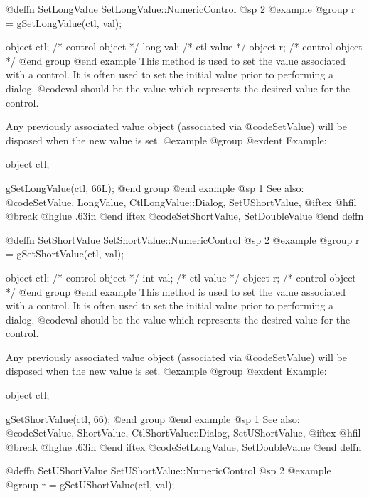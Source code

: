 @deffn {SetLongValue} SetLongValue::NumericControl
@sp 2
@example
@group
r = gSetLongValue(ctl, val);

object  ctl;    /*  control object  */
long    val;    /*  ctl value       */
object  r;      /*  control object  */
@end group
@end example
This method is used to set the value associated with a control.  It is
often used to set the initial value prior to performing a dialog.
@code{val} should be the value which represents the desired value for
the control.

Any previously associated value object (associated via @code{SetValue})
will be disposed when the new value is set.
@example
@group
@exdent Example:

object  ctl;

gSetLongValue(ctl, 66L);
@end group
@end example
@sp 1
See also:  @code{SetValue, LongValue, CtlLongValue::Dialog, SetUShortValue,}
@iftex
@hfil @break @hglue .63in 
@end iftex
@code{SetShortValue, SetDoubleValue}
@end deffn














@deffn {SetShortValue} SetShortValue::NumericControl
@sp 2
@example
@group
r = gSetShortValue(ctl, val);

object  ctl;    /*  control object  */
int     val;    /*  ctl value       */
object  r;      /*  control object  */
@end group
@end example
This method is used to set the value associated with a control.  It is
often used to set the initial value prior to performing a dialog.
@code{val} should be the value which represents the desired value for
the control.

Any previously associated value object (associated via @code{SetValue})
will be disposed when the new value is set.
@example
@group
@exdent Example:

object  ctl;

gSetShortValue(ctl, 66);
@end group
@end example
@sp 1
See also:  @code{SetValue, ShortValue, CtlShortValue::Dialog, SetUShortValue,}
@iftex
@hfil @break @hglue .63in 
@end iftex
@code{SetLongValue, SetDoubleValue}
@end deffn











@deffn {SetUShortValue} SetUShortValue::NumericControl
@sp 2
@example
@group
r = gSetUShortValue(ctl, val);

